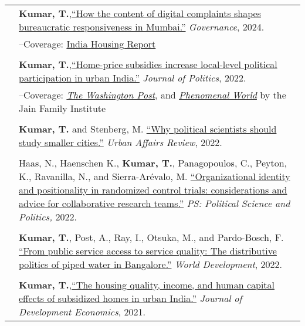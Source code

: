 \documentclass[letterpaper, 10.5pt]{article}
\begin{document}
\begin{longtable}{p{1.5in}p{5in}}
&\textbf{Kumar, T.},\href{https://onlinelibrary.wiley.com/doi/10.1111/gove.12889}{``How the content of digital complaints shapes bureaucratic responsiveness in Mumbai.''}   \textit{\textit{Governance}}, 2024. \\
&--\indent Coverage: \href{https://indiahousingreport.in/outputs/opinion/how-the-content-of-demands-shapes-government-responsiveness-excerpts-from-a-discussion/}{India Housing Report}\\
& \\
& \textbf{Kumar, T.},\href{https://doi.org/10.1086/715605}{``Home-price subsidies increase local-level political participation in urban India.''} \textit{Journal of Politics}, 2022.\\
& --\indent Coverage: \href{https://www.washingtonpost.com/news/monkey-cage/wp/2019/01/31/heres-what-gavin-newsom-elizabeth-warren-and-microsoft-should-know-if-want-to-end-the-affordable-housing-crisis/?tid=sm_tw_cage}{\textit{The Washington Post}}, and \href{https://www.phenomenalworld.org/sources/original-and-forgery/}{\textit{Phenomenal World}} by the Jain Family Institute  \\
& \\
& \textbf{Kumar, T.} and Stenberg, M. \href{https://doi.org/10.1177/10780874221124610}{``Why political scientists should study smaller cities.''}  \textit{Urban Affairs Review}, 2022. \\
& \\

& Haas, N., Haenschen K., \textbf{Kumar, T.}, Panagopoulos, C., Peyton, K., Ravanilla, N., and Sierra-Ar\'{e}valo, M. \href{https://www.doi.org/10.1017/S1049096522000026}{``Organizational identity and positionality in randomized control trials: considerations and advice for collaborative research teams.''} \textit{PS: Political Science and Politics,} 2022. \\
& \\
& \textbf{Kumar, T.}, Post, A., Ray, I., Otsuka, M., and Pardo-Bosch, F. \href{https://doi.org/10.1016/j.worlddev.2021.105736}{``From public service access to service quality: The distributive politics of piped water in Bangalore.''} \textit{World Development}, 2022. \\

& \\

&\textbf{Kumar, T.},\href{https://doi.org/10.1016/j.jdeveco.2021.102738}{``The housing quality, income, and human capital effects of subsidized homes in urban India.''} \textit{Journal of Development Economics}, 2021.\\


\end{longtable}
\end{document}
